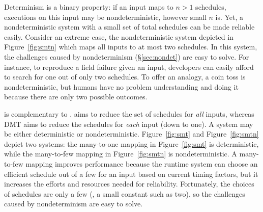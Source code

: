  Determinism
is a binary property: if an input maps to $n > 1$ schedules, executions on this
input may be nondeterministic, however small $n$ is.  Yet, a nondeterministic
system with a small set of total schedules can be made reliable easily. 
Consider an extreme case, the nondeterministic system depicted in
Figure~\ref{fig:smtn} which maps all inputs to at most two schedules.  In this
system, the challenges caused by nondeterminism (\S\ref{sec:nondet}) are
easy to solve.  For instance, to reproduce a field failure given an input,
developers can easily afford to search for one out of only two schedules.
To offer an analogy, a coin toss is nondeterministic, but humans have
no problem understanding and doing it because there are only two possible
outcomes.

\dmt is complementary to \smt. \smt aims to reduce the set of schedules for
\emph{all} inputs, whereas DMT aims to reduce the schedules for \emph{each}
input (down to one).  A \smt system may be either deterministic or
nondeterministic. Figure~\ref{fig:smt} and Figure~\ref{fig:smtn} depict two \smt
systems: the many-to-one mapping in Figure~\ref{fig:smt} is deterministic, while
the many-to-few mapping in Figure~\ref{fig:smtn} is nondeterministic.  A
many-to-few mapping improves performance because the runtime system can choose
an efficient schedule out of a few for an input based on current timing factors,
but it increases the efforts and resources needed for reliability.  Fortunately,
the choices of schedules are only a few (\eg, a small constant such as two), so
the challenges caused by nondeterminism are easy to solve.
